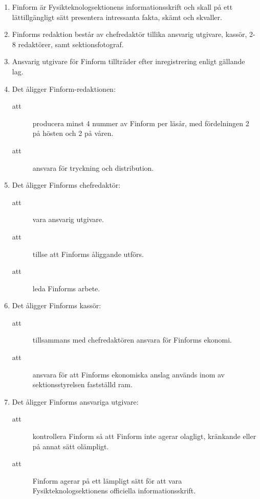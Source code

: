 \documentclass[11pt,a4paper]{article}
\begin{document}
\begin{enumerate}[\thesubsection .1]

  \item Finform är Fysikteknologsektionens informationsskrift och
  skall på ett lättillgängligt sätt presentera intressanta fakta,
  skämt och skvall\-er. 

  \item Finforms redaktion består av chefredaktör tillika ansvarig utgivare, kassör, 2-8
  redak\-tör\-er, samt sektionsfotograf.

  \item Ansvarig utgivare för Finform tillträder efter
  inregistrering enligt gällande lag.

  \item Det åligger Finform-redaktionen:
    \begin{description}
      \item[att] producera minst 4 nummer av Finform per läsår, med för\-del\-ningen 2 på hösten och 2 på våren.
      \item[att] ansvara för tryckning och distribution.

    \end{description}

  \item Det åligger Finforms chefredaktör:
    \begin{description}
       \item[att] vara ansvarig utgivare.
      \item[att] tillse att Finforms åliggande  utförs.
      \item[att] leda Finforms arbete.
    \end{description}


  \item Det åligger Finforms kassör:
    \begin{description}
      \item[att] tillsammans med chefredaktören ansvara för Finforms ekonomi.
      \item[att] ansvara för att Finforms ekonomiska anslag används inom av sektionsstyrelsen fastställd ram.
    \end{description}


  \item Det åligger Finforms ansvariga utgivare:
    \begin{description}
      \item[att] kontrollera Finform så att Finform inte agerar olagligt, krän\-kan\-de eller på annat sätt olämpligt.
      \item[att] Finform agerar på ett lämpligt sätt för att vara Fysikteknolog\-sek\-tionens officiella informationsskrift.
    \end{description}

\end{enumerate}
\end{document}
